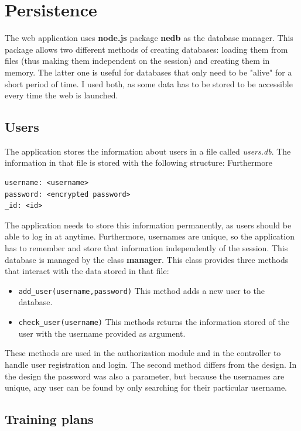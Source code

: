 \documentclass[12pt,twoside,titlepage,a4paper]{article}
\theoremstyle{definicion}
\theoremstyle{lema}
\theoremstyle{teorema}
\theoremstyle{corolario}
\theoremstyle{ejemplo}
\theoremstyle{nota}
\begin{document}
\newpage
\section{Persistence}

The web application uses \textbf{node.js} package \textbf{nedb} as the database  manager. This package allows two different methods 
of creating databases: loading them from files (thus making them independent on the session) and creating them in memory. The latter
one is useful for databases that only need to be "alive" for a short period of time. I used both, as some data has to be stored to be
accessible every time the web is launched.

\subsection{Users}

The application stores the information about users in a file called \textit{users.db}. The information in that file is stored with the
following structure:
Furthermore
\begin{lstlisting}
username: <username>
password: <encrypted password>
_id: <id>
\end{lstlisting}
The application needs to store this information permanently, as users should be able to log in at anytime. Furthermore, usernames are
unique, so the application has to remember and store that information independently of the session. This database is managed by the class
\textbf{manager}. This class provides three methods that interact with the data stored in that file:
\begin{itemize} [noitemsep]
	\item \texttt{add\_user(username,password)} This method adds a new user to the database.
	\item \texttt{check\_user(username)} This methods returns the information stored of the user with the username provided as argument.
\end{itemize}
These methods are used in the authorization module and in the controller to handle user registration and login. The second method differs
from the design. In the design the password was also a parameter, but because the usernames are unique, any user can be found by only 
searching for their particular username.

\subsection{Training plans}
\end{document}
